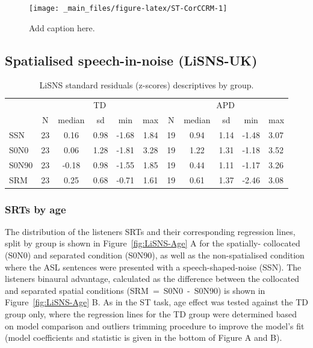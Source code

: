 \documentclass[a4paper, twoside]{templates/ociamthesis}
\begin{document}
\begin{figure}

{\centering \texttt{[image: \_main\_files/figure-latex/ST-CorCCRM-1]} 

}

\caption{Add caption here.}\label{fig:ST-CorCCRM}
\end{figure}

\hypertarget{spatialised-speech-in-noise-lisns-uk-1}{%
\subsection{Spatialised speech-in-noise (LiSNS-UK)}\label{spatialised-speech-in-noise-lisns-uk-1}}

\begin{table}

\caption{\label{tab:LiSNS-ztab}LiSNS standard residuals (z-scores) descriptives by group.}
\centering
\begin{tabular}[t]{lcccccccccl}
\toprule
\multicolumn{1}{c}{ } & \multicolumn{5}{c}{TD} & \multicolumn{5}{c}{APD} \\
\cmidrule(l{3pt}r{3pt}){2-6} \cmidrule(l{3pt}r{3pt}){7-11}
 & N & median & sd & min & max & N & median & sd & min & max\\
\midrule
SSN & 23 & 0.16 & 0.98 & -1.68 & 1.84 & 19 & 0.94 & 1.14 & -1.48 & 3.07\\
S0N0 & 23 & 0.06 & 1.28 & -1.81 & 3.28 & 19 & 1.22 & 1.31 & -1.18 & 3.52\\
S0N90 & 23 & -0.18 & 0.98 & -1.55 & 1.85 & 19 & 0.44 & 1.11 & -1.17 & 3.26\\
SRM & 23 & 0.25 & 0.68 & -0.71 & 1.61 & 19 & 0.61 & 1.37 & -2.46 & 3.08\\
\bottomrule
\end{tabular}
\end{table}

\hypertarget{srts-by-age}{%
\subsubsection*{SRTs by age}\label{srts-by-age}}

The distribution of the listeners SRTs and their corresponding regression lines, split by group is shown in Figure~\ref{fig:LiSNS-Age} A for the spatially- collocated (S0N0) and separated condition (S0N90), as well as the non-spatialised condition where the ASL sentences were presented with a speech-shaped-noise (SSN). The listeners binaural advantage, calculated as the difference between the collocated and separated spatial conditions (SRM~=~S0N0~-~S0N90) is shown in Figure~\ref{fig:LiSNS-Age} B. As in the ST task, age effect was tested against the TD group only, where the regression lines for the TD group were determined based on model comparison and outliers trimming procedure to improve the model's fit (model coefficients and statistic is given in the bottom of Figure A and B).
\end{document}
